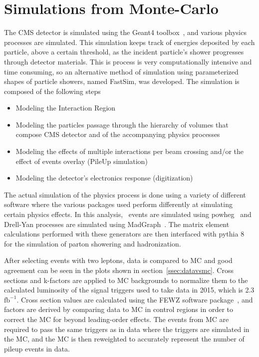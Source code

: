 \begin{table}[htb]
\begin{center}
\begin{tabular}{l}
    \end{tabular}
  \end{center}
\end{table}

\clearpage

\section{Simulations from Monte-Carlo}
The CMS detector is simulated using the Geant4 toolbox~\cite{Geant}, and various physics processes are simulated.
This simulation keeps track of energies deposited by each particle,
above a certain threshold, as the incident particle's shower progresses through detector materials.
This is process is very computationally intensive and time consuming,
so an alternative method of simulation using parameterized shapes of particle showers, named FastSim, was developed.
The simulation is composed of the following steps
\begin{itemize}
\item Modeling the Interaction Region
\item Modeling the particles passage through the hierarchy of volumes that compose CMS detector and of the accompanying physics processes
\item Modeling the effects of multiple interactions per beam crossing and/or the effect of events overlay (PileUp simulation)
\item Modeling the detector's electronics response (digitization)
\end{itemize}

The actual simulation of the physics process is done using a variety of different software where the various packages used perform differently at simulating certain physics effects.
In this analysis, \ttbar\ events are simulated using powheg~\cite{powheg} and Drell-Yan processes are simulated using MadGraph~\cite{aMCatNLO}.
The matrix element calculations performed with these generators are then interfaced with pythia 8~\cite{Pythia} for the simulation of parton showering and hadronization.

After selecting events with two leptons, data is compared to MC and good agreement can be seen in the plots shown in section~\ref{ssec:datavsmc}.
Cross sections and k-factors are applied to MC backgrounds to normalize them to the calculated luminosity of the signal triggers used to take data in 2015, which is 2.3 $\mathrm{fb^{-1}}$.
Cross section values are calculated using the FEWZ software package~\cite{Li:2012wna},
and factors are derived by comparing data to MC in control regions in order to correct the MC for beyond leading-order effects. %
The events from MC are required to pass the same triggers as in data where the triggers are simulated in the MC,
and the MC is then reweighted to accurately represent the number of pileup events in data.


